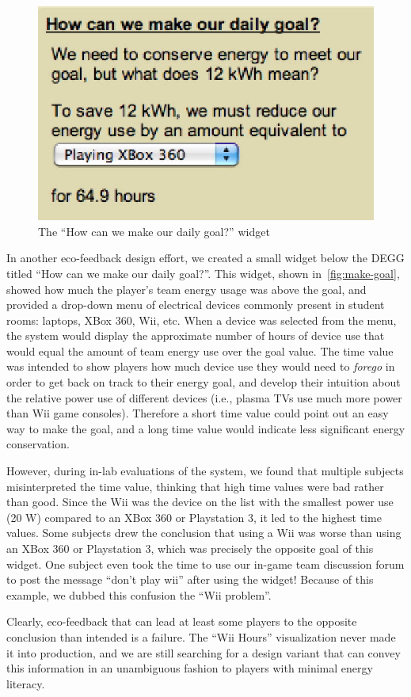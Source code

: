 \documentclass{sigchi}
\begin{document}
\begin{figure}[!tb]
	\centering
	\includegraphics[width=0.6\columnwidth]{how-meet-goal.eps}
	\caption{The ``How can we make our daily goal?'' widget}
	\label{fig:make-goal}
\end{figure}

In another eco-feedback design effort, we created a small widget below the DEGG titled ``How can we make our daily goal?''. This widget, shown in~\autoref{fig:make-goal}, showed how much the player's team energy usage was above the goal, and provided a drop-down menu of electrical devices commonly present in student rooms: laptops, XBox 360, Wii, etc. When a device was selected from the menu, the system would display the approximate number of hours of device use that would equal the amount of team energy use over the goal value. The time value was intended to show players how much device use they would need to \emph{forego} in order to get back on track to their energy goal, and develop their intuition about the relative power use of different devices (i.e., plasma TVs use much more power than Wii game consoles). Therefore a short time value could point out an easy way to make the goal, and a long time value would indicate less significant energy conservation.

However, during in-lab evaluations of the system, we found that multiple subjects misinterpreted the time value, thinking that high time values were bad rather than good. Since the Wii was the device on the list with the smallest power use (20 W) compared to an XBox 360 or Playstation 3, it led to the highest time values. Some subjects drew the conclusion that using a Wii was worse than using an XBox 360 or Playstation 3, which was precisely the opposite goal of this widget. One subject even took the time to use our in-game team discussion forum to post the message ``don't play wii'' after using the widget! Because of this example, we dubbed this confusion the ``Wii problem''.

Clearly, eco-feedback that can lead at least some players to the opposite conclusion than intended is a failure. The ``Wii Hours'' visualization never made it into production, and we are still searching for a design variant that can convey this information in an unambiguous fashion to players with minimal energy literacy.
\end{document}
